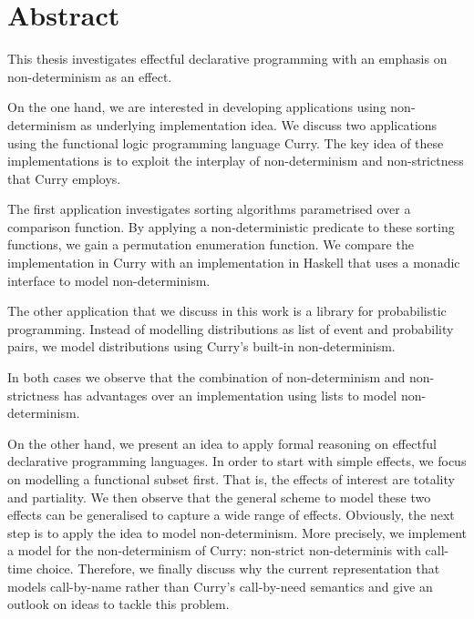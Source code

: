 %
\begingroup
\let\cleardoublepage\clearpage

\chapter*{Abstract}
\label{sec:abstract}
This thesis investigates effectful declarative programming with an emphasis on non-deter\-mi\-nism as an effect.

On the one hand, we are interested in developing applications using non-deter\-mi\-nism as underlying implementation idea.
We discuss two applications using the functional logic programming language Curry.
The key idea of these implementations is to exploit the interplay of non-deter\-mi\-nism and non-strictness that Curry employs.

The first application investigates sorting algorithms parametrised over a comparison function.
By applying a non-deterministic predicate to these sorting functions, we gain a permutation enumeration function.
We compare the implementation in Curry with an implementation in Haskell that uses a monadic interface to model non-deter\-mi\-nism.

The other application that we discuss in this work is a library for probabilistic programming.
Instead of modelling distributions as list of event and probability pairs, we model distributions using Curry's built-in non-deter\-mi\-nism.

In both cases we observe that the combination of non-deter\-mi\-nism and non-strictness has advantages over an implementation using lists to model non-deter\-mi\-nism.

On the other hand, we present an idea to apply formal reasoning on effectful declarative programming languages.
In order to start with simple effects, we focus on modelling a functional subset first.
That is, the effects of interest are totality and partiality.
We then observe that the general scheme to model these two effects can be generalised to capture a wide range of effects.
Obviously, the next step is to apply the idea to model non-deter\-mi\-nism.
More precisely, we implement a model for the non-deter\-mi\-nism of Curry: non-strict non-deter\-mi\-nis with call-time choice.
Therefore, we finally discuss why the current representation that models call-by-name rather than Curry's call-by-need semantics and give an outlook on ideas to tackle this problem.

